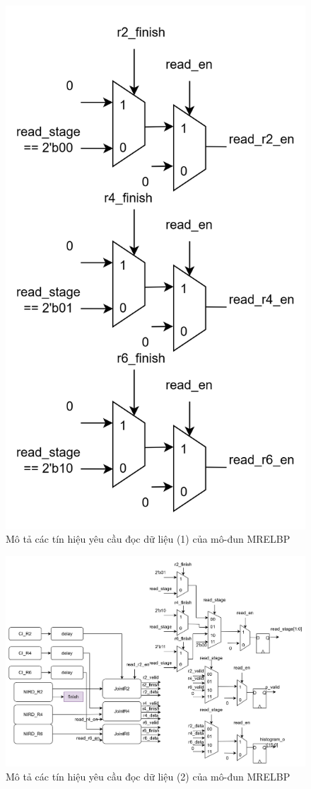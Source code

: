 \begin{figure}[!ht]
\begin{minipage}[t]{0.48\linewidth}
		\includegraphics[width=0.8\linewidth]{figures/topRTL2.png} %
		\caption{Mô tả các tín hiệu yêu cầu đọc dữ liệu (1) của mô-đun MRELBP} 
		\label{fig:topRTL2}
	\end{minipage}
\end{figure}
\begin{figure}[!ht]
	\centering
	\includegraphics[width=0.9\linewidth]{figures/topRTL1.png}
	\caption{Mô tả các tín hiệu yêu cầu đọc dữ liệu (2) của mô-đun MRELBP}
	\label{fig:topRTL1}
\end{figure}
